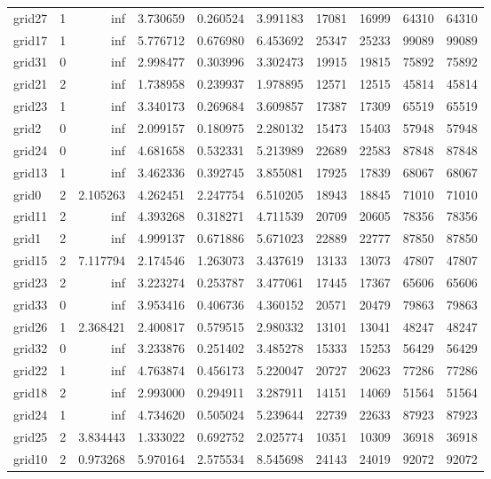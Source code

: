 \begin{longtable}{|l|r|r|r|r|r|r|r|r|r|}
grid27 & 1 & inf & 3.730659 & 0.260524 & 3.991183 & 17081 & 16999 & 64310 & 64310 \\
grid17 & 1 & inf & 5.776712 & 0.676980 & 6.453692 & 25347 & 25233 & 99089 & 99089 \\
grid31 & 0 & inf & 2.998477 & 0.303996 & 3.302473 & 19915 & 19815 & 75892 & 75892 \\
grid21 & 2 & inf & 1.738958 & 0.239937 & 1.978895 & 12571 & 12515 & 45814 & 45814 \\
grid23 & 1 & inf & 3.340173 & 0.269684 & 3.609857 & 17387 & 17309 & 65519 & 65519 \\
grid2 & 0 & inf & 2.099157 & 0.180975 & 2.280132 & 15473 & 15403 & 57948 & 57948 \\
grid24 & 0 & inf & 4.681658 & 0.532331 & 5.213989 & 22689 & 22583 & 87848 & 87848 \\
grid13 & 1 & inf & 3.462336 & 0.392745 & 3.855081 & 17925 & 17839 & 68067 & 68067 \\
grid0 & 2 & 2.105263 & 4.262451 & 2.247754 & 6.510205 & 18943 & 18845 & 71010 & 71010 \\
grid11 & 2 & inf & 4.393268 & 0.318271 & 4.711539 & 20709 & 20605 & 78356 & 78356 \\
grid1 & 2 & inf & 4.999137 & 0.671886 & 5.671023 & 22889 & 22777 & 87850 & 87850 \\
grid15 & 2 & 7.117794 & 2.174546 & 1.263073 & 3.437619 & 13133 & 13073 & 47807 & 47807 \\
grid23 & 2 & inf & 3.223274 & 0.253787 & 3.477061 & 17445 & 17367 & 65606 & 65606 \\
grid33 & 0 & inf & 3.953416 & 0.406736 & 4.360152 & 20571 & 20479 & 79863 & 79863 \\
grid26 & 1 & 2.368421 & 2.400817 & 0.579515 & 2.980332 & 13101 & 13041 & 48247 & 48247 \\
grid32 & 0 & inf & 3.233876 & 0.251402 & 3.485278 & 15333 & 15253 & 56429 & 56429 \\
grid22 & 1 & inf & 4.763874 & 0.456173 & 5.220047 & 20727 & 20623 & 77286 & 77286 \\
grid18 & 2 & inf & 2.993000 & 0.294911 & 3.287911 & 14151 & 14069 & 51564 & 51564 \\
grid24 & 1 & inf & 4.734620 & 0.505024 & 5.239644 & 22739 & 22633 & 87923 & 87923 \\
grid25 & 2 & 3.834443 & 1.333022 & 0.692752 & 2.025774 & 10351 & 10309 & 36918 & 36918 \\
grid10 & 2 & 0.973268 & 5.970164 & 2.575534 & 8.545698 & 24143 & 24019 & 92072 & 92072 \\

\end{longtable}
